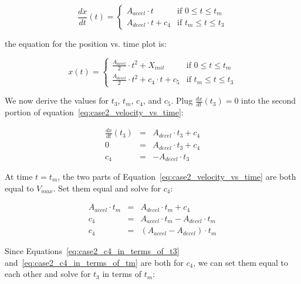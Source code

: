 \documentclass[11pt]{article} %
\begin{document}
\begin{equation}
\frac{dx}{dt}(t) = \left\{
  \begin{array}{rl}
     A_{accel}  \cdot t & \text{if } 0 \le t \le t_m\\
     A_{decel}  \cdot t + c_4 & \text{if } t_m \le t \le t_3 
  \end{array} \right.
\label{eq:case2_velocity_vs_time}
\end{equation}

\noindent the equation for the position vs. time plot is:

\begin{equation}
x(t)  = \left\{
  \begin{array}{rl}
     \frac{A_{accel}}{2}  \cdot t^2 + X_{init} & \text{if } 0 \le t \le t_m\\
    \frac{A_{decel}}{2}  \cdot t^2 + c_4 \cdot t + c_5 & \text{if } t_m \le t \le t_3 
  \end{array} \right.
\label{eq:case2_position_vs_time}
\end{equation}

\noindent We now derive the values for $t_3$, $t_m$, $c_4$, and $c_5$. Plug $\frac{dx}{dt}(t_3) = 0$ into the second portion of equation~\ref{eq:case2_velocity_vs_time}:

\begin{eqnarray}
\frac{dx}{dt}(t_3) & = &  A_{decel} \cdot t_3 + c_4 \nonumber \\
0 & = &  A_{decel} \cdot t_3 + c_4 \nonumber \\
c_4 & = & -A_{decel} \cdot t_3 \label{eq:case2_c4_in_terms_of_t3}
\end{eqnarray}

\noindent At time $t = t_m$, the two parts of Equation~\ref{eq:case2_velocity_vs_time} are both equal to $V_{max}$. Set them equal and solve for $c_4$:

\begin{eqnarray}
A_{accel} \cdot t_m & = & A_{decel} \cdot t_m + c_4 \nonumber \\
c_4 & = & A_{accel} \cdot t_m - A_{decel} \cdot t_m \nonumber \\
c_4 & = & (A_{accel} - A_{decel}) \cdot t_m \label{eq:case2_c4_in_terms_of_tm}
\end{eqnarray}

\noindent Since Equations~\ref{eq:case2_c4_in_terms_of_t3} and~\ref{eq:case2_c4_in_terms_of_tm} are both for $c_4$, we can set them equal to each other and solve for $t_3$ in terms of $t_m$:
\end{document}
